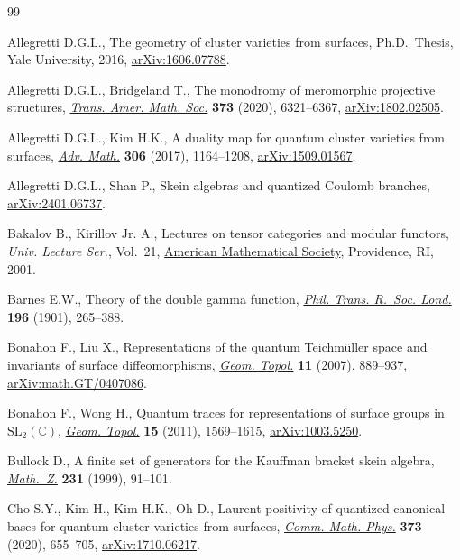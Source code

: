 \documentclass[10pt,a4paper]{amsart}
\numberwithin{equation}{section}
\theoremstyle{definition}
\begin{document}
\begin{thebibliography}{99}
\footnotesize\itemsep=0pt

Allegretti D.G.L., The geometry of cluster varieties from surfaces, Ph.D.~Thesis, {Y}ale University, 2016,
 \href{http://arxiv.org/abs/1606.07788}{arXiv:1606.07788}.

Allegretti D.G.L., Bridgeland T., The monodromy of meromorphic projective
 structures, \href{https://doi.org/10.1090/tran/8093}{\textit{Trans. Amer.
 Math. Soc.}} \textbf{373} (2020), 6321--6367,
 \href{http://arxiv.org/abs/1802.02505}{arXiv:1802.02505}.

Allegretti D.G.L., Kim H.K., A duality map for quantum cluster varieties from
 surfaces, \href{https://doi.org/10.1016/j.aim.2016.11.007}{\textit{Adv.
 Math.}} \textbf{306} (2017), 1164--1208,
 \href{http://arxiv.org/abs/1509.01567}{arXiv:1509.01567}.

Allegretti D.G.L., Shan P., Skein algebras and quantized Coulomb branches,
 \href{http://arxiv.org/abs/2401.06737}{arXiv:2401.06737}.

Bakalov B., Kirillov Jr. A., Lectures on tensor categories and modular
 functors, \textit{Univ. Lecture Ser.}, Vol.~21,
 \href{https://doi.org/10.1090/ulect/021}{American Mathematical Society},
 Providence, RI, 2001.

Barnes E.W., Theory of the double gamma function,
 \href{https://doi.org/10.1098/rsta.1901.0006}{\textit{Phil. Trans. R.~Soc.
 Lond.}} \textbf{196} (1901), 265--388.

Bonahon F., Liu X., Representations of the quantum {T}eichm\"{u}ller space and
 invariants of surface diffeomorphisms,
 \href{https://doi.org/10.2140/gt.2007.11.889}{\textit{Geom. Topol.}}
 \textbf{11} (2007), 889--937,
 \href{http://arxiv.org/abs/math.GT/0407086}{arXiv:math.GT/0407086}.

Bonahon F., Wong H., Quantum traces for representations of surface groups in
 {$\mathrm{ SL}_2(\mathbb{C})$},
 \href{https://doi.org/10.2140/gt.2011.15.1569}{\textit{Geom. Topol.}}
 \textbf{15} (2011), 1569--1615,
 \href{http://arxiv.org/abs/1003.5250}{arXiv:1003.5250}.

Bullock D., A finite set of generators for the {K}auffman bracket skein
 algebra, \href{https://doi.org/10.1007/PL00004727}{\textit{Math.~Z.}}
 \textbf{231} (1999), 91--101.

Cho S.Y., Kim H., Kim H.K., Oh D., Laurent positivity of quantized canonical
 bases for quantum cluster varieties from surfaces,
 \href{https://doi.org/10.1007/s00220-019-03411-w}{\textit{Comm. Math. Phys.}}
 \textbf{373} (2020), 655--705,
 \href{http://arxiv.org/abs/1710.06217}{arXiv:1710.06217}.


\end{thebibliography}
\end{document}

